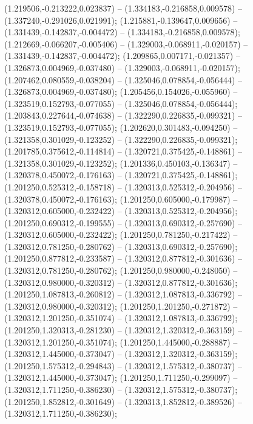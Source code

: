  (1.219506,-0.213222,0.023837) -- (1.334183,-0.216858,0.009578) -- (1.337240,-0.291026,0.021991);
 (1.215881,-0.139647,0.009656) -- (1.331439,-0.142837,-0.004472) -- (1.334183,-0.216858,0.009578);
 (1.212669,-0.066207,-0.005406) -- (1.329003,-0.068911,-0.020157) -- (1.331439,-0.142837,-0.004472);
 (1.209865,0.007171,-0.021357) -- (1.326873,0.004969,-0.037480) -- (1.329003,-0.068911,-0.020157);
 (1.207462,0.080559,-0.038204) -- (1.325046,0.078854,-0.056444) -- (1.326873,0.004969,-0.037480);
 (1.205456,0.154026,-0.055960) -- (1.323519,0.152793,-0.077055) -- (1.325046,0.078854,-0.056444);
 (1.203843,0.227644,-0.074638) -- (1.322290,0.226835,-0.099321) -- (1.323519,0.152793,-0.077055);
 (1.202620,0.301483,-0.094250) -- (1.321358,0.301029,-0.123252) -- (1.322290,0.226835,-0.099321);
 (1.201785,0.375612,-0.114814) -- (1.320721,0.375425,-0.148861) -- (1.321358,0.301029,-0.123252);
 (1.201336,0.450103,-0.136347) -- (1.320378,0.450072,-0.176163) -- (1.320721,0.375425,-0.148861);
 (1.201250,0.525312,-0.158718) -- (1.320313,0.525312,-0.204956) -- (1.320378,0.450072,-0.176163);
 (1.201250,0.605000,-0.179987) -- (1.320312,0.605000,-0.232422) -- (1.320313,0.525312,-0.204956);
 (1.201250,0.690312,-0.199555) -- (1.320313,0.690312,-0.257690) -- (1.320312,0.605000,-0.232422);
 (1.201250,0.781250,-0.217422) -- (1.320312,0.781250,-0.280762) -- (1.320313,0.690312,-0.257690);
 (1.201250,0.877812,-0.233587) -- (1.320312,0.877812,-0.301636) -- (1.320312,0.781250,-0.280762);
 (1.201250,0.980000,-0.248050) -- (1.320312,0.980000,-0.320312) -- (1.320312,0.877812,-0.301636);
 (1.201250,1.087813,-0.260812) -- (1.320312,1.087813,-0.336792) -- (1.320312,0.980000,-0.320312);
 (1.201250,1.201250,-0.271872) -- (1.320312,1.201250,-0.351074) -- (1.320312,1.087813,-0.336792);
 (1.201250,1.320313,-0.281230) -- (1.320312,1.320312,-0.363159) -- (1.320312,1.201250,-0.351074);
 (1.201250,1.445000,-0.288887) -- (1.320312,1.445000,-0.373047) -- (1.320312,1.320312,-0.363159);
 (1.201250,1.575312,-0.294843) -- (1.320312,1.575312,-0.380737) -- (1.320312,1.445000,-0.373047);
 (1.201250,1.711250,-0.299097) -- (1.320312,1.711250,-0.386230) -- (1.320312,1.575312,-0.380737);
 (1.201250,1.852812,-0.301649) -- (1.320313,1.852812,-0.389526) -- (1.320312,1.711250,-0.386230);
